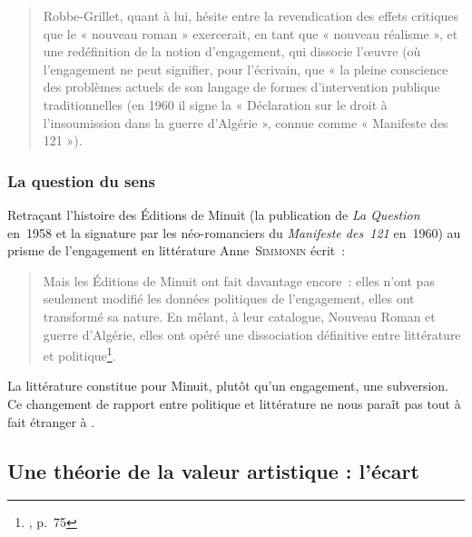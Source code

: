 \documentclass[12pt, a4paper]{article}
\begin{document}
\begin{quote}
    Robbe-Grillet, quant à lui, hésite entre la revendication des effets critiques que le « nouveau roman » exercerait, en tant que « nouveau réalisme », et une redéfinition de la notion d’engagement, qui dissocie l’œuvre (où l’engagement ne peut signifier, pour l’écrivain, que « la pleine conscience des problèmes actuels de son langage de formes d’intervention publique traditionnelles (en 1960 il signe la « Déclaration sur le droit à l’insoumission dans la guerre d’Algérie », connue comme « Manifeste des 121 »)\int.
\end{quote}



\subsubsection{La question du sens}



Retraçant l'histoire des Éditions de Minuit (la publication de \textit{La Question} en~1958 et la signature par les néo-romanciers du \textit{Manifeste des~121} en~1960) au prisme de l'engagement en littérature Anne~\textsc{Simmonin} écrit~:

\begin{quote}
    Mais les Éditions de Minuit ont fait davantage encore~: elles n'ont pas seulement modifié les données politiques de l'engagement, elles ont transformé sa nature. En mêlant, à leur catalogue, Nouveau Roman et guerre d'Algérie, elles ont opéré une dissociation définitive entre littérature et politique\footnote{, p.~75}. 
\end{quote}

La littérature constitue pour Minuit, plutôt qu'un engagement, une subversion. Ce changement de rapport entre politique et littérature ne nous paraît pas tout à fait étranger à \punr.


\subsection{Une théorie de la valeur artistique : l'écart}
\label{theorie}
\end{document}
